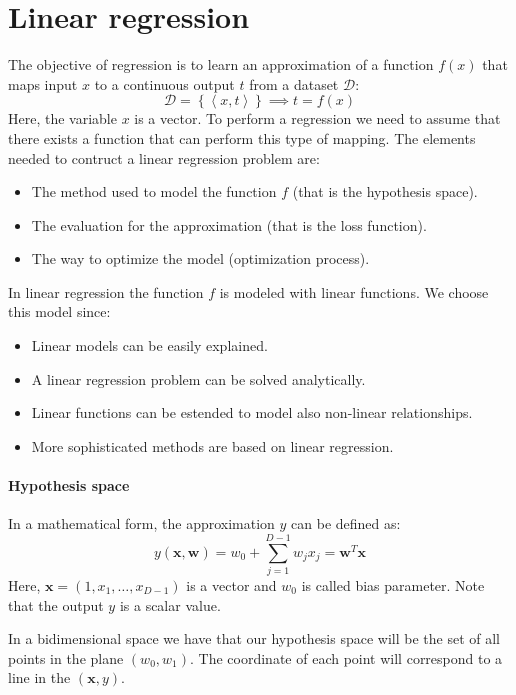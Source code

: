 \section{Linear regression}

The objective of regression is to learn an approximation of a function $f(x)$ that maps input $x$ to a continuous output $t$ from a dataset $\mathcal{D}$: 
\[\mathcal{D}=\left\{ \left\langle x,t \right\rangle \right\} \implies t=f(x)\]
Here, the variable $x$ is a vector. 
To perform a regression we need to assume that there exists a function that can perform this type of mapping. 
The elements needed to contruct a linear regression problem are: 
\begin{itemize}
    \item The method used to model the function $f$ (that is the hypothesis space). 
    \item The evaluation for the approximation (that is the loss function). 
    \item The way to optimize the model (optimization process). 
\end{itemize}

In linear regression the function $f$ is modeled with linear functions. 
We choose this model since: 
\begin{itemize}
    \item Linear models can be easily explained. 
    \item A linear regression problem can be solved analytically. 
    \item Linear functions can be estended to model also non-linear relationships. 
    \item More sophisticated methods are based on linear regression. 
\end{itemize}

\paragraph*{Hypothesis space}
In a mathematical form, the approximation $y$ can be defined as: 
\[y(\textbf{x},\textbf{w})=w_0+\sum_{j=1}^{D-1}w_j x_j=\textbf{w}^T\textbf{x}\]
Here, $\textbf{x} = \left( 1,x_1,\dots,x_{D-1} \right)$ is a vector and $w_0$ is called bias parameter. 
Note that the output $y$ is a scalar value. 

In a bidimensional space we have that our hypothesis space will be the set of all points in the plane $(w_0,w_1)$. 
The coordinate of each point will correspond to a line in the $\left( \textbf{x}, y \right)$. 

